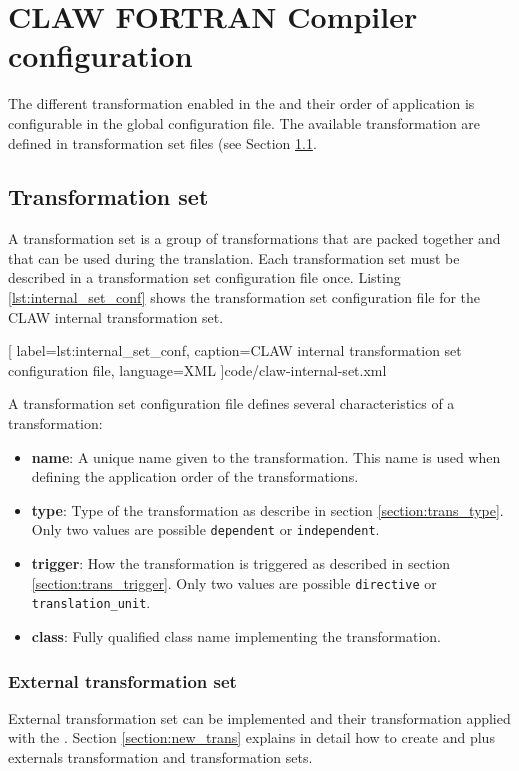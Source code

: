\chapter{CLAW FORTRAN Compiler configuration}
\label{chapter:configuration}

The different transformation enabled in the \clawfcomp and their order of 
application is configurable in the \clawfcomp global configuration file. The
available transformation are defined in transformation set files (see Section 
\ref{section:conf_trans_set}.

\section{Transformation set}
\label{section:conf_trans_set}
A transformation set is a group of transformations that are packed together and
that can be used during the translation. Each transformation set must be
described in a transformation set configuration file once. Listing 
\ref{lst:internal_set_conf} shows the transformation set configuration file for
the CLAW internal transformation set.


  [
    label=lst:internal_set_conf,
    caption=CLAW internal transformation set configuration file,
    language=XML
  ]{code/claw-internal-set.xml}

A transformation set configuration file defines several characteristics of a
transformation:
\begin{itemize}
  \item \textbf{name}: A unique name given to the transformation. This name is used when
        defining the application order of the transformations.
  \item \textbf{type}: Type of the transformation as describe in section
        \ref{section:trans_type}. Only two values are possible
        \lstinline|dependent| or \lstinline|independent|.
  \item \textbf{trigger}: How the transformation is triggered as described in section
        \ref{section:trans_trigger}. Only two values are possible
        \lstinline|directive| or \lstinline|translation_unit|.
  \item \textbf{class}: Fully qualified class name implementing the transformation.
\end{itemize}

\subsection{External transformation set}
External transformation set can be implemented and their transformation applied
with the \clawfcomp. Section \ref{section:new_trans} explains in detail how to
create and plus externals transformation and transformation sets. 

